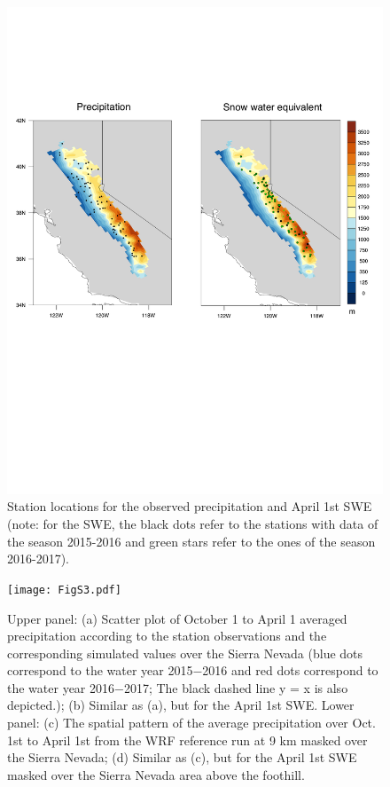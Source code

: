 \documentclass[draft,grl]{agutexSI}
\begin{document}

\begin{figure}
\begin{center}
\includegraphics[width=6in]{FigS2.pdf}
\caption{Station locations for the observed precipitation and April 1st SWE (note: for the SWE, the black dots refer to the stations with data of the season 2015-2016 and green stars refer to the ones of the season 2016-2017).}
\end{center}
\end{figure}


\begin{figure}
\begin{center}
\texttt{[image: FigS3.pdf]}
\caption{Upper panel: (a) Scatter plot of October 1 to April 1 averaged precipitation according to the station observations and the corresponding simulated values over the Sierra Nevada (blue dots correspond to the water year 2015$-$2016 and red dots correspond to the water year 2016$-$2017; The black dashed line y = x is also depicted.); (b) Similar as (a), but for the April 1st SWE. Lower panel: (c) The spatial pattern of the average precipitation over Oct. 1st to April 1st from the WRF reference run at 9 km masked over the Sierra Nevada; (d) Similar as (c), but for the April 1st SWE masked over the Sierra Nevada area above the foothill.}
\end{center}
\end{figure}
\end{document}
